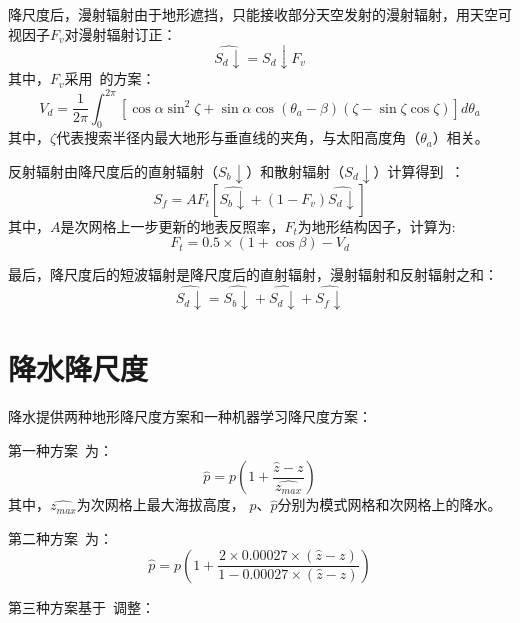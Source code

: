降尺度后，漫射辐射由于地形遮挡，只能接收部分天空发射的漫射辐射，用天空可视因子$F_{v}$对漫射辐射订正：
\begin{equation}
\hat{S_{d}\downarrow}=S_{d}\downarrow F_{v}
\end{equation}
其中，$F_{v}$采用~\citet{dozier1990}的方案：
\begin{equation}
V_{d}=\frac{1}{2\pi} \int_{0}^{2\pi} [\cos{\alpha}\sin^2{\zeta}+\sin{\alpha}\cos{\left(\theta_{a}-\beta\right)}\left(\zeta-\sin{\zeta}\cos{\zeta}\right)]d\theta_{a}
\end{equation}
其中，$\zeta$代表搜索半径内最大地形与垂直线的夹角，与太阳高度角（$\theta_{a}$）相关。

反射辐射由降尺度后的直射辐射（$S_{b}\downarrow$）和散射辐射（$S_{d}\downarrow$）计算得到~\citep{tao2018}：
\begin{equation}
S_{f}=A F_{t} [\hat{S_{b}\downarrow}+\left(1-F_{v}\right)\hat{S_{d}\downarrow}]
\end{equation}
其中，$A$是次网格上一步更新的地表反照率，$F_{t}$为地形结构因子，计算为:
\begin{equation}
F_{t}=0.5 \times \left(1+\cos{\beta}\right)-V_{d}
\end{equation}

最后，降尺度后的短波辐射是降尺度后的直射辐射，漫射辐射和反射辐射之和：
\begin{equation}
\hat{S_{d}\downarrow}=\hat{S_{b}\downarrow}+\hat{S_{d}\downarrow}+\hat{S_{f}\downarrow}
\end{equation}

\section{降水降尺度}
降水提供两种地形降尺度方案和一种机器学习降尺度方案：

第一种方案~\citep{Tesfa2020}为：
\begin{equation}
\hat{p}=p \left({1+\frac{\hat{z}-z}{\hat{z_{max}}}}\right)
\end{equation}
其中，$\hat{z_{max}}$为次网格上最大海拔高度，
$p$、$\hat{p}$分别为模式网格和次网格上的降水。

第二种方案~\citep{liston2006Meteorological}为：
\begin{equation}
\hat{p}=p \left(1+\frac{2 \times 0.00027 \times \left(\hat{z}-z\right)}{1- 0.00027 \times \left(\hat{z}-z\right)}\right)
\end{equation}

第三种方案基于~\citep{mei2020}调整：

